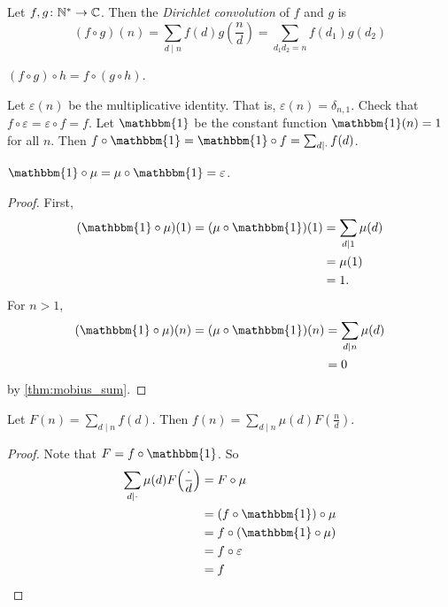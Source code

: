 \begin{definition*} \label{def:dirichlet}
    Let $f, g\colon \mathbb{N}^* \to \mathbb{C}$.
    Then the \emph{Dirichlet convolution} of $f$ and $g$ is \[
        (f \circ g)(n) = \sum_{d \mid n} f(d) g(\frac{n}{d})
            = \sum_{d_1 d_2 = n} f(d_1) g(d_2)
    \]
\end{definition*}
\begin{exercise}
    $(f \circ g) \circ h = f \circ (g \circ h)$.
\end{exercise}
Let $\varepsilon(n)$ be the multiplicative identity.
That is, $\varepsilon(n) = \delta_{n,1}$.
Check that $f \circ \varepsilon = \varepsilon \circ f = f$.
Let $\mathbbm{1}$ be the constant function $\mathbbm{1}(n) = 1$ for all $n$.
Then $f \circ \mathbbm{1} = \mathbbm{1} \circ f = \sum_{d \mid \cdot} f(d)$.
\begin{lemma}
    $\mathbbm{1} \circ \mu = \mu \circ \mathbbm{1} = \varepsilon$.
\end{lemma}
\begin{proof}
    First, \begin{align*}
        (\mathbbm{1} \circ \mu)(1) = (\mu \circ \mathbbm{1})(1)
        &= \sum_{d \mid 1} \mu(d) \\
        &= \mu(1) \\
        &= 1.
    \end{align*}
    For $n > 1$, \begin{align*}
        (\mathbbm{1} \circ \mu)(n) = (\mu \circ \mathbbm{1})(n)
        &= \sum_{d \mid n} \mu(d) \\
        &= 0
    \end{align*}
    by \cref{thm:mobius_sum}.
\end{proof}

\begin{theorem*} \label{thm:nt:mobius_inversion}
    Let $F(n) = \sum_{d \mid n} f(d)$.
    Then $f(n) = \sum_{d \mid n} \mu(d) F(\frac{n}{d})$.
\end{theorem*}
\begin{proof}
    Note that $F = f \circ \mathbbm{1}$.
    So \begin{align*}
        \sum_{d \mid \cdot} \mu(d) F\paren*[\Big]{\frac{\cdot}{d}}
            &= F \circ \mu \\
            &= (f \circ \mathbbm{1}) \circ \mu \\
            &= f \circ (\mathbbm{1} \circ \mu) \\
            &= f \circ \varepsilon \\
            &= f \qedhere
    \end{align*}
\end{proof}
